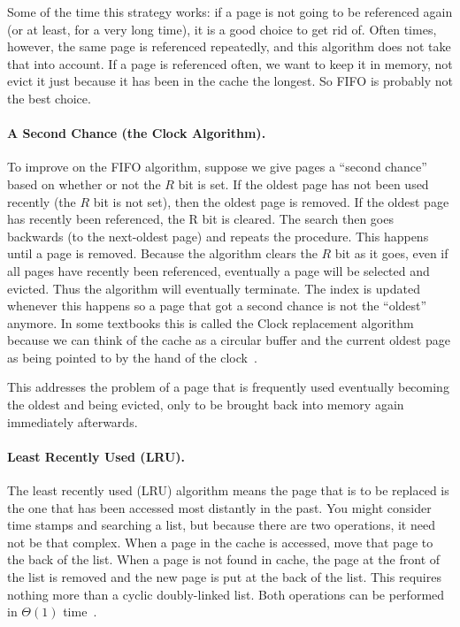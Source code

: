 Some of the time this strategy works: if a page is not going to be referenced again (or at least, for a very long time), it is a good choice to get rid of. Often times, however, the same page is referenced repeatedly, and this algorithm does not take that into account. If a page is referenced often, we want to keep it in memory, not evict it just because it has been in the cache the longest. So FIFO is probably not the best choice.

\paragraph{A Second Chance (the Clock Algorithm).} 
To improve on the FIFO algorithm, suppose we give pages a ``second chance'' based on whether or not the $R$ bit is set. If the oldest page has not been used recently (the $R$ bit is not set), then the oldest page is removed. If the oldest page has recently been referenced, the R bit is cleared. The search then goes backwards (to the next-oldest page) and repeats the procedure. This happens until a page is removed. Because the algorithm clears the $R$ bit as it goes, even if all pages have recently been referenced, eventually a  page will be selected and evicted. Thus the algorithm will eventually terminate. The index is updated whenever this happens so a page that got a second chance is not the ``oldest'' anymore. In some textbooks this is called the Clock replacement algorithm because we can think of the cache as a circular buffer and the current oldest page as being pointed to by the hand of the clock~\cite{mos}. 

This addresses the problem of a page that is frequently used eventually becoming the oldest and being evicted, only to be brought back into memory again immediately afterwards.

\paragraph{Least Recently Used (LRU).}
The least recently used (LRU) algorithm means the page that is to be replaced is the one that has been accessed most distantly in the past. You might consider time stamps and searching a list, but because there are two operations, it need not be that complex. When a page in the cache is accessed, move that page to the back of the list. When a page is not found in cache, the page at the front of the list is removed and the new page is put at the back of the list. This requires nothing more than a cyclic doubly-linked list. Both operations can be performed in $\Theta(1)$ time~\cite{mte241}.

